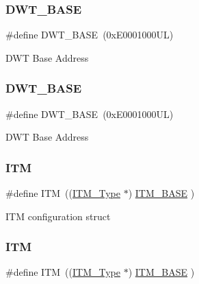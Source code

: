 \subsubsection{\texorpdfstring{DWT\_BASE}{DWT\_BASE}\hspace{0.1cm}{\footnotesize\ttfamily [2/3]}}
{\footnotesize\ttfamily \#define D\+W\+T\+\_\+\+B\+A\+SE~(0x\+E0001000\+U\+L)}

D\+WT Base Address \mbox{\label{group___c_m_s_i_s__core__base_gafdab534f961bf8935eb456cb7700dcd2}} 
\subsubsection{\texorpdfstring{DWT\_BASE}{DWT\_BASE}\hspace{0.1cm}{\footnotesize\ttfamily [3/3]}}
{\footnotesize\ttfamily \#define D\+W\+T\+\_\+\+B\+A\+SE~(0x\+E0001000\+U\+L)}

D\+WT Base Address \mbox{\label{group___c_m_s_i_s__core__base_gabae7cdf882def602cb787bb039ff6a43}} 
\subsubsection{\texorpdfstring{ITM}{ITM}\hspace{0.1cm}{\footnotesize\ttfamily [1/3]}}
{\footnotesize\ttfamily \#define I\+TM~((\mbox{\hyperlink{struct_i_t_m___type}{I\+T\+M\+\_\+\+Type}}       $\ast$)     \mbox{\hyperlink{group___c_m_s_i_s__core__base_gadd76251e412a195ec0a8f47227a8359e}{I\+T\+M\+\_\+\+B\+A\+SE}}      )}

I\+TM configuration struct \mbox{\label{group___c_m_s_i_s__core__base_gabae7cdf882def602cb787bb039ff6a43}} 
\subsubsection{\texorpdfstring{ITM}{ITM}\hspace{0.1cm}{\footnotesize\ttfamily [2/3]}}
{\footnotesize\ttfamily \#define I\+TM~((\mbox{\hyperlink{struct_i_t_m___type}{I\+T\+M\+\_\+\+Type}}       $\ast$)     \mbox{\hyperlink{group___c_m_s_i_s__core__base_gadd76251e412a195ec0a8f47227a8359e}{I\+T\+M\+\_\+\+B\+A\+SE}}      )}


